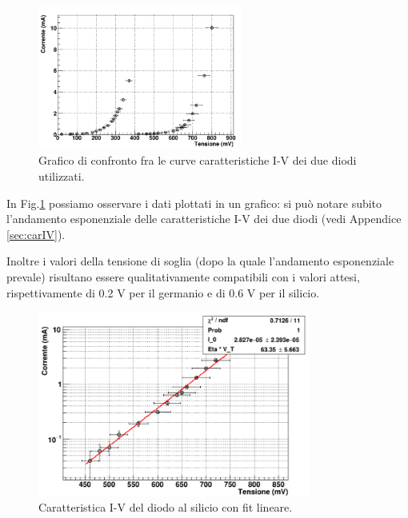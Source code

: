\documentclass[a4paper, 11pt]{article}
\begin{document}
\begin{figure}[!htb]
    \centering
    \includegraphics[width = 0.6\textwidth]{Immagini - Prima prova/LAB _ Grafico totale.png}
    \caption{Grafico di confronto fra le curve caratteristiche I-V dei due diodi utilizzati.}
    \label{fig:graficototale}
\end{figure}

In Fig.\ref{fig:graficototale} possiamo osservare i dati plottati in un grafico: si può notare subito l'andamento esponenziale delle caratteristiche I-V dei due diodi (vedi Appendice \ref{sec:carIV}).

Inoltre i valori della tensione di soglia (dopo la quale l'andamento esponenziale prevale) risultano essere qualitativamente compatibili con i valori attesi, rispettivamente di 0.2 V per il germanio e di 0.6 V per il silicio.
\\

\begin{figure}[!htb]
    \centering
    \includegraphics[width = 0.8\textwidth]{Immagini - Prima prova/LAB _ Fit silicio.png}
    \caption{Caratteristica I-V del diodo al silicio con fit lineare.}
    \label{fig:siliciofit}
\end{figure}

\newpage
\end{document}
